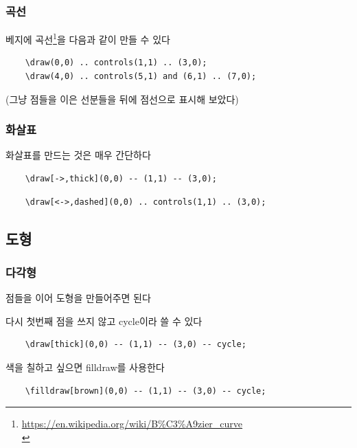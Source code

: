 \documentclass[12pt]{beamer}
\begin{document}
\subsubsection{곡선}
\begin{frame}[fragile]{\secname}{\subsecname}
	베지에 곡선\footnote{\url{https://en.wikipedia.org/wiki/B\%C3\%A9zier_curve}\\}을 다음과 같이 만들 수 있다
	\begin{lstlisting}
	\draw(0,0) .. controls(1,1) .. (3,0); 
	\draw(4,0) .. controls(5,1) and (6,1) .. (7,0);
	\end{lstlisting}
	
	\vfill
	{\footnotesize (그냥 점들을 이은 선분들을 뒤에 점선으로 표시해 보았다)}
\end{frame}

\subsubsection{화살표}
\begin{frame}[fragile]{\secname}{\subsecname}
	화살표를 만드는 것은 매우 간단하다
	\begin{lstlisting}
	\draw[->,thick](0,0) -- (1,1) -- (3,0);
	\end{lstlisting}
	
	
	\begin{lstlisting}
	\draw[<->,dashed](0,0) .. controls(1,1) .. (3,0);
	\end{lstlisting}
	
	
\end{frame}

\subsection{도형}
\subsubsection{다각형}
\begin{frame}[fragile]{\secname}{\subsecname}
	점들을 이어 도형을 만들어주면 된다
	
	다시 첫번째 점을 쓰지 않고 cycle이라 쓸 수 있다
	\begin{lstlisting}
	\draw[thick](0,0) -- (1,1) -- (3,0) -- cycle;
	\end{lstlisting}
	
	
	색을 칠하고 싶으면 filldraw를 사용한다
	
	\begin{lstlisting}
	\filldraw[brown](0,0) -- (1,1) -- (3,0) -- cycle;
	\end{lstlisting}
	
	
\end{frame}
\end{document}
